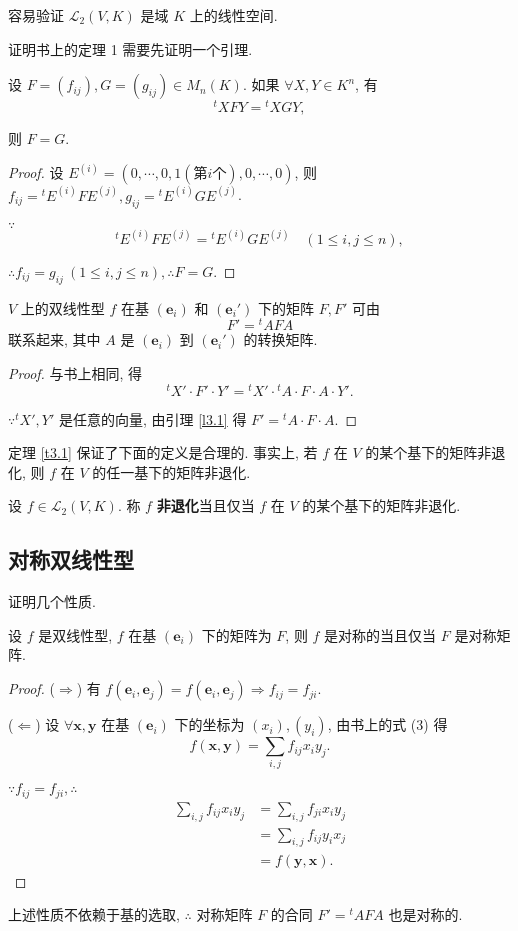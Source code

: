 \documentclass{ctexart}
\begin{document}
容易验证 $\mathcal{L}_2(V,K)$ 是域 $K$ 上的线性空间.


证明书上的定理 1 需要先证明一个引理.
\begin{lemma}\label{l3.1}
    设 $F=(f_{ij}),G=(g_{ij})\in M_n(K)$. 如果 $\forall X,Y\in K^n$, 有
    \[{}^tXFY={}^tXGY,\]

    则 $F=G$.
\end{lemma}
\begin{proof}
    设 $E^{(i)}=(0,\cdots,0,1(\text{第}i\text{个}),0,\cdots,0)$, 则 $f_{ij}={}^tE^{(i)}FE^{(j)},g_{ij}={}^tE^{(i)}GE^{(j)}$.

    $\because$
    \[{}^tE^{(i)}FE^{(j)}={}^tE^{(i)}GE^{(j)}\quad(1\leq i,j\leq n),\]

    $\therefore f_{ij}=g_{ij}\ (1\leq i,j\leq n),\therefore F=G$.
\end{proof}
\begin{theorem}[书上的定理 1]\label{t3.1}
    $V$ 上的双线性型 $f$ 在基 $(\boldsymbol{e}_i)$ 和 $(\boldsymbol{e}_i')$ 下的矩阵 $F,F'$ 可由
    \[F'={}^tAFA\]
    联系起来, 其中 $A$ 是 $(\boldsymbol{e}_i)$ 到 $(\boldsymbol{e}_i')$ 的转换矩阵.
\end{theorem}
\begin{proof}
    与书上相同, 得
    \[{}^tX'\cdot F'\cdot Y'={}^tX'\cdot{}^tA\cdot F\cdot A\cdot Y'.\]

    $\because{}^tX',Y'$ 是任意的向量, 由引理 \ref{l3.1} 得 $F'={}^tA\cdot F\cdot A$.
\end{proof}
定理 \ref{t3.1} 保证了下面的定义是合理的. 事实上, 若 $f$ 在 $V$ 的某个基下的矩阵非退化, 则 $f$ 在 $V$ 的任一基下的矩阵非退化.
\begin{definition}
    设 $f\in\mathcal{L}_2(V,K)$. 称 $f$ \textbf{非退化}当且仅当 $f$ 在 $V$ 的某个基下的矩阵非退化.
\end{definition}
\subsection{对称双线性型}
证明几个性质.
\begin{property}\label{p3.1}
    设 $f$ 是双线性型, $f$ 在基 $(\boldsymbol{e}_i)$ 下的矩阵为 $F$, 则 $f$ 是对称的当且仅当 $F$ 是对称矩阵.
\end{property}
\begin{proof}
    ($\Rightarrow$) 有 $f(\boldsymbol{e}_i,\boldsymbol{e}_j)=f(\boldsymbol{e}_i,\boldsymbol{e}_j)\Rightarrow f_{ij}=f_{ji}$.

    ($\Leftarrow$) 设 $\forall\boldsymbol{x},\boldsymbol{y}$ 在基 $(\boldsymbol{e}_i)$ 下的坐标为 $(x_i),(y_i)$, 由书上的式 (3) 得
    \[f(\boldsymbol{x},\boldsymbol{y})=\sum\limits_{i,j}f_{ij}x_iy_j.\]

    $\because f_{ij}=f_{ji},\therefore$
    \begin{align*}
        \sum\limits_{i,j}f_{ij}x_iy_j & =\sum\limits_{i,j}f_{ji}x_iy_j \\
        & =\sum\limits_{i,j}f_{ij}y_ix_j \\
        & =f(\boldsymbol{y},\boldsymbol{x}).
    \end{align*}
\end{proof}
上述性质不依赖于基的选取, $\therefore$ 对称矩阵 $F$ 的合同 $F'={}^tAFA$ 也是对称的.
\end{document}
